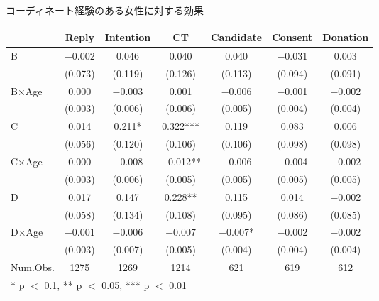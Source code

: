 \documentclass[
      aspectratio=169,
        12pt,
    ]{beamer}
\begin{document}
\begin{frame}{コーディネート経験のある女性に対する効果}
\protect\hypertarget{ux30b3ux30fcux30c7ux30a3ux30cdux30fcux30c8ux7d4cux9a13ux306eux3042ux308bux5973ux6027ux306bux5bfeux3059ux308bux52b9ux679c}{}
\begin{table}
\centering
\fontsize{9}{11}\selectfont
\begin{tabular}[t]{lcccccc}
\toprule
  & Reply & Intention & CT & Candidate & Consent & Donation\\
\midrule
B & \num{-0.002} & \num{0.046} & \num{0.040} & \num{0.040} & \num{-0.031} & \num{0.003}\\
 & (\num{0.073}) & (\num{0.119}) & (\num{0.126}) & (\num{0.113}) & (\num{0.094}) & (\num{0.091})\\
B×Age & \num{0.000} & \num{-0.003} & \num{0.001} & \num{-0.006} & \num{-0.001} & \num{-0.002}\\
 & (\num{0.003}) & (\num{0.006}) & (\num{0.006}) & (\num{0.005}) & (\num{0.004}) & (\num{0.004})\\
C & \num{0.014} & \num{0.211}* & \num{0.322}*** & \num{0.119} & \num{0.083} & \num{0.006}\\
 & (\num{0.056}) & (\num{0.120}) & (\num{0.106}) & (\num{0.106}) & (\num{0.098}) & (\num{0.098})\\
C×Age & \num{0.000} & \num{-0.008} & \num{-0.012}** & \num{-0.006} & \num{-0.004} & \num{-0.002}\\
 & (\num{0.003}) & (\num{0.006}) & (\num{0.005}) & (\num{0.005}) & (\num{0.005}) & (\num{0.005})\\
D & \num{0.017} & \num{0.147} & \num{0.228}** & \num{0.115} & \num{0.014} & \num{-0.002}\\
 & (\num{0.058}) & (\num{0.134}) & (\num{0.108}) & (\num{0.095}) & (\num{0.086}) & (\num{0.085})\\
D×Age & \num{-0.001} & \num{-0.006} & \num{-0.007} & \num{-0.007}* & \num{-0.002} & \num{-0.002}\\
 & (\num{0.003}) & (\num{0.007}) & (\num{0.005}) & (\num{0.004}) & (\num{0.004}) & (\num{0.004})\\
\midrule
Num.Obs. & \num{1275} & \num{1269} & \num{1214} & \num{621} & \num{619} & \num{612}\\
\bottomrule
\multicolumn{7}{l}{\rule{0pt}{1em}* p $<$ 0.1, ** p $<$ 0.05, *** p $<$ 0.01}\\
\end{tabular}
\end{table}
\end{frame}
\end{document}
